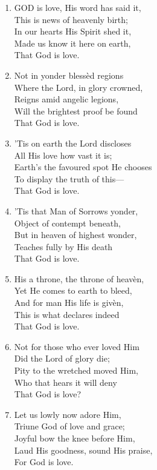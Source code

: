 \begin{enumerate}
    \item GOD is love, His word has said it, \\
        This is news of heavenly birth; \\
        In our hearts His Spirit shed it, \\
        Made us know it here on earth, \\
        That God is love.

    \item Not in yonder bless\`ed regions \\
        Where the Lord, in glory crowned, \\
        Reigns amid angelic legions, \\
        Will the brightest proof be found \\
        That God is love.

    \item 'Tis on earth the Lord discloses \\
        All His love how vast it is; \\
        Earth's the favoured spot He chooses \\
        To display the truth of this--- \\
        That God is love.

    \item 'Tis that Man of Sorrows yonder, \\
        Object of contempt beneath, \\
        But in heaven of highest wonder, \\
        Teaches fully by His death \\
        That God is love.

    \item His a throne, the throne of heav\`en, \\
        Yet He comes to earth to bleed, \\
        And for man His life is giv\`en, \\
        This is what declares indeed \\
        That God is love.

    \item Not for those who ever loved Him \\
        Did the Lord of glory die; \\
        Pity to the wretched moved Him, \\
        Who that hears it will deny \\
        That God is love?

    \item Let us lowly now adore Him, \\
        Triune God of love and grace; \\
        Joyful bow the knee before Him, \\
        Laud His goodness, sound His praise, \\
        For God is love.

\end{enumerate}

